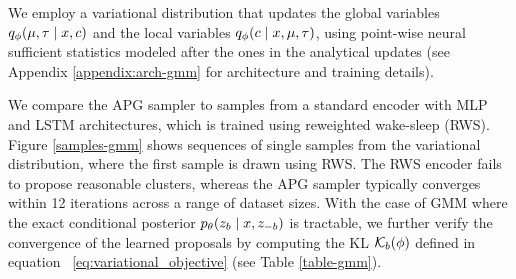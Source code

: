 \documentclass[anonymous=false, %
               format=acmsmall, %
               review=true, %
               screen=true, %
               nonacm=true]{acmart}
\theoremstyle{definition}
\begin{document}
We employ a variational distribution that updates the global variables $q_\phi(\mu, \tau \mid x, c)$ and the local variables $q_\phi(c \mid x, \mu, \tau)$, using point-wise neural sufficient statistics modeled after the ones in the analytical updates (see Appendix \ref{appendix:arch-gmm} for architecture and training details). 

We compare the APG sampler to samples from a standard encoder with MLP and LSTM architectures,  which is trained using reweighted wake-sleep (RWS). Figure \ref{samples-gmm} shows sequences of single samples from the variational distribution, where the first sample is drawn using RWS. The RWS encoder fails to propose reasonable clusters, whereas the APG sampler typically converges within 12 iterations across a range of dataset sizes. With the case of GMM where the exact conditional posterior  $p_\theta(z_b \mid x, z_{-b})$ is tractable, we further verify the convergence of the learned proposals by computing the KL $\mathcal{K}_b(\phi)$ defined in equation ~\ref{eq:variational_objective} (see Table \ref{table-gmm}).

\end{document}
